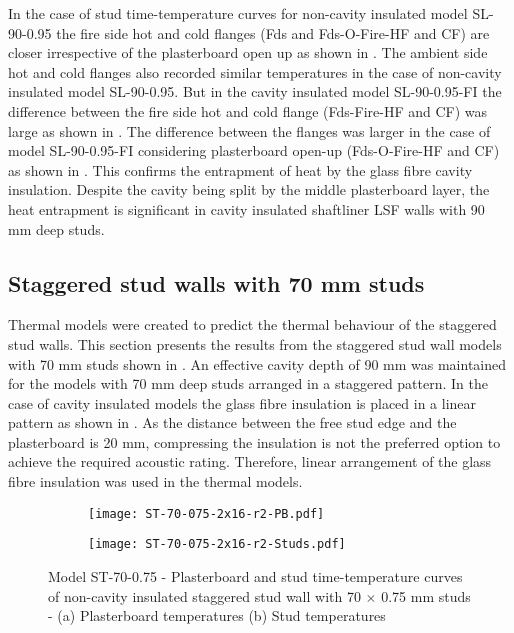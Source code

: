 In the case of stud time-temperature curves for non-cavity insulated model SL-90-0.95 the fire side hot and cold flanges (Fds and Fds-O-Fire-HF and CF) are closer irrespective of the plasterboard open up as shown in . The ambient side hot and cold flanges also recorded similar temperatures in the case of non-cavity insulated model SL-90-0.95. But in the cavity insulated model SL-90-0.95-FI the difference between the fire side hot and cold flange (Fds-Fire-HF and CF) was large as shown in . The difference between the flanges was larger in the case of model SL-90-0.95-FI considering plasterboard open-up (Fds-O-Fire-HF and CF) as shown in . This confirms the entrapment of heat by the glass fibre cavity insulation. Despite the cavity being split by the middle plasterboard layer, the heat entrapment is significant in cavity insulated shaftliner LSF walls with 90 mm deep studs. 

\subsection{Staggered stud walls with 70 mm studs}

Thermal models were created to predict the thermal behaviour of the staggered stud walls. This section presents the results from the staggered stud wall models with 70 mm studs shown in . An effective cavity depth of 90 mm was maintained for the models with 70 mm deep studs arranged in a staggered pattern. In the case of cavity insulated models the glass fibre insulation is placed in a linear pattern as shown in . As the distance between the free stud edge and the plasterboard is 20 mm, compressing the insulation is not the preferred option to achieve the required acoustic rating. Therefore, linear arrangement of the glass fibre insulation was used in the thermal models. 
\begin{figure}[!htbp]
	\centering
	\begin{subfigure}[b]{0.6\textwidth}
		\centering
		\texttt{[image: ST-70-075-2x16-r2-PB.pdf]}
		\caption{}
		\label{subfig:ST-70-075-2x16-r2-PB}
	\end{subfigure}
	\begin{subfigure}[b]{0.6\textwidth}
		\centering
		\texttt{[image: ST-70-075-2x16-r2-Studs.pdf]}
		\caption{}
		\label{subfig:ST-70-075-2x16-r2-Studs}
	\end{subfigure}
	   \caption{Model ST-70-0.75 - Plasterboard and stud time-temperature curves of non-cavity insulated staggered stud wall with 70 $\times$ 0.75 mm studs - (a) Plasterboard temperatures (b) Stud temperatures}
	   \label{fig:ST-70-075-2x16-r2}
\end{figure}

